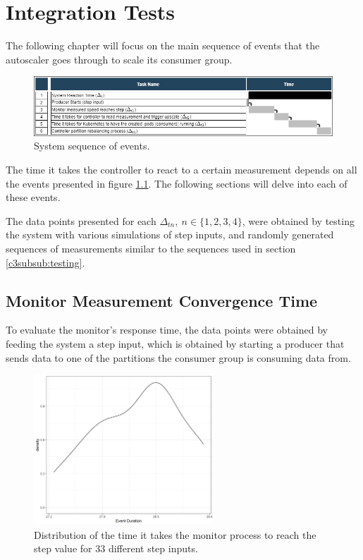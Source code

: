 \chapter{Integration Tests} 
\label{chap:integration_tests}

The following chapter will focus on the main sequence of events that the
autoscaler goes through to scale its consumer group. 

\begin{figure}[H]
\centering
\includegraphics[width=\textwidth]{images/integration/integration_gant.png}
\caption{System sequence of events.}
\label{fig:step_event_sequence}
\end{figure}

The time it takes the controller to react to a certain measurement depends on
all the events presented in figure \ref{fig:step_event_sequence}. The following
sections will delve into each of these events. 

The data points presented for each $\Delta_{tn}, \ n \in \{1, 2, 3, 4\}$, were
obtained by testing the system with various simulations of step inputs, and
randomly generated sequences of measurements similar to the sequences used in
section \ref{c3subsub:testing}.

\section{Monitor Measurement Convergence Time}
\label{c3sec:MonitorMeasurement}

To evaluate the monitor's response time, the data points were obtained by
feeding the system a step input, which is obtained by starting a producer that
sends data to one of the partitions the consumer group is consuming data from.

\begin{figure}[H]
\centering
\includegraphics[width=0.6\textwidth]{images/integration/delta1.png}
\caption{Distribution of the time it takes the monitor process to reach the step value for 33 different step inputs.}
\label{fig:controller_result_monitor}
\end{figure}

